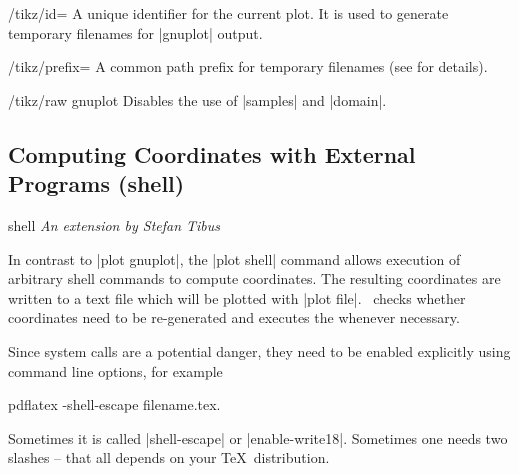 {\begin{key}{/tikz/id=}
	 A unique identifier for the current plot. It is used to generate temporary filenames for |gnuplot| output.
\end{key}

\begin{key}{/tikz/prefix=}
	 A common path prefix for temporary filenames (see \cite[section~18.6]{tikz} for details).
\end{key}

\begin{key}{/tikz/raw gnuplot}
	 Disables the use of |samples| and |domain|.
\end{key}

\subsection{Computing Coordinates with External Programs (shell)}

\begin{addplotoperation}[]{shell}{}
{\small \emph{An extension by Stefan Tibus}}

In contrast to |plot gnuplot|, the |plot shell| command allows execution of arbitrary shell commands to compute coordinates. The resulting coordinates are written to a text file which will be plotted with |plot file|. \PGF\ checks whether coordinates need to be re-generated and executes the  whenever necessary.

Since system calls are a potential danger, they need to be enabled explicitly using command line options, for example
\begin{codeexample}
pdflatex -shell-escape filename.tex.
\end{codeexample}
Sometimes it is called |shell-escape| or |enable-write18|. Sometimes one needs two slashes -- that all depends on your \TeX\ distribution.
\begin{codeexample}[]
\end{codeexample}

\begin{codeexample}[]
\end{codeexample}


\end{addplotoperation}}
